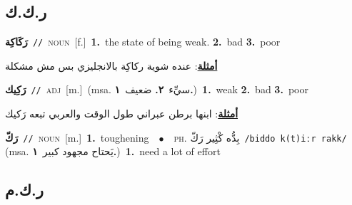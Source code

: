 \documentclass[10pt,a4paper,twoside]{article} %
\begin{document}
\begin{multicols}{2}
\vspace{-3mm}
\subsection*{\color{blue}\foreignlanguage{arabic}{ر.ك.ك}\color{blue}{}} 

{\setlength\topsep{0pt}\textbf{\foreignlanguage{arabic}{رَكَاكِة}}\ {\color{gray}\texttt{//}\color{black}}\ \textsc{noun}\ [f.]\ \textbf{1.}~the state of being weak.  \textbf{2.}~bad  \textbf{3.}~poor\  \begin{flushright}\color{gray}\foreignlanguage{arabic}{\textbf{\underline{\foreignlanguage{arabic}{أمثلة}}}: عنده شوية ركاكِة بالانجليزي بس مش مشكلة}\end{flushright}\color{black}} \vspace{2mm}

{\setlength\topsep{0pt}\textbf{\foreignlanguage{arabic}{رَكِيك}}\ {\color{gray}\texttt{//}\color{black}}\ \textsc{adj}\ [m.]\ \color{gray}(msa. \foreignlanguage{arabic}{سيِّء}~\foreignlanguage{arabic}{\textbf{٢.}}  \foreignlanguage{arabic}{ضعيف}~\foreignlanguage{arabic}{\textbf{١.}})\color{black}\ \textbf{1.}~weak  \textbf{2.}~bad  \textbf{3.}~poor\  \begin{flushright}\color{gray}\foreignlanguage{arabic}{\textbf{\underline{\foreignlanguage{arabic}{أمثلة}}}: ابنها برطن عبراني طول الوقت والعربي تبعه رَكيك}\end{flushright}\color{black}} \vspace{2mm}

{\setlength\topsep{0pt}\textbf{\foreignlanguage{arabic}{رَكّ}}\ {\color{gray}\texttt{//}\color{black}}\ \textsc{noun}\ [m.]\ \textbf{1.}~toughening\ \ $\bullet$\ \ \textsc{ph.} \color{gray} \foreignlanguage{arabic}{بِدُّه كْثِير رَكّ}\color{black}\ {\color{gray}\texttt{/{\sffamily biddo k(t)iːr rakk}/}\color{black}}\ \color{gray} (msa. \foreignlanguage{arabic}{يَحتاح مجهود كبير}~\foreignlanguage{arabic}{\textbf{١.}})\color{black}\ \textbf{1.}~need a lot of effort\ } \vspace{2mm}

\vspace{-3mm}
\subsection*{\color{blue}\foreignlanguage{arabic}{ر.ك.م}\color{blue}{}} 


\end{multicols}
\end{document}
